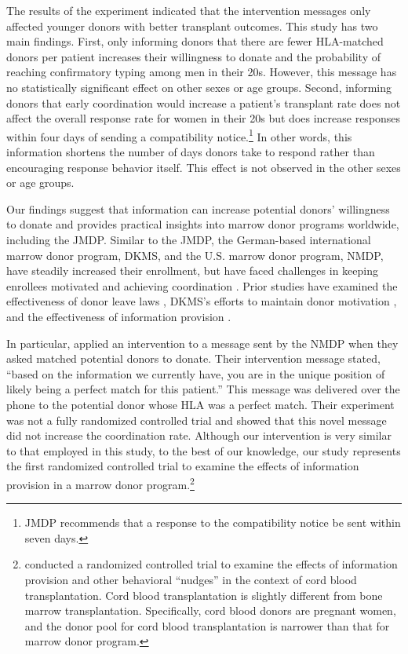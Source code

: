 \documentclass[12pt, a4paper]{article}
\begin{document}
The results of the experiment indicated that the intervention messages only affected younger donors with better transplant outcomes. This study has two main findings. First, only informing donors that there are fewer HLA-matched donors per patient increases their willingness to donate and the probability of reaching confirmatory typing among men in their 20s. However, this message has no statistically significant effect on other sexes or age groups. Second, informing donors that early coordination would increase a patient's transplant rate does not affect the overall response rate for women in their 20s but does increase responses within four days of sending a compatibility notice.\footnote{JMDP recommends that a response to the compatibility notice be sent within seven days.} In other words, this information shortens the number of days donors take to respond rather than encouraging response behavior itself. This effect is not observed in the other sexes or age groups.

Our findings suggest that information can increase potential donors' willingness to donate and provides practical insights into marrow donor programs worldwide, including the JMDP. Similar to the JMDP, the German-based international marrow donor program, DKMS, and the U.S. marrow donor program, NMDP, have steadily increased their enrollment, but have faced challenges in keeping enrollees motivated and achieving coordination \citep{Switzer1999, Switzer2004, Haylock2022}. Prior studies have examined the effectiveness of donor leave laws \citep{Lacetera2014}, DKMS's efforts to maintain donor motivation \citep{Haylock2022}, and the effectiveness of information provision \citep{Switzer2018}.

In particular, \citet{Switzer2018} applied an intervention to a message sent by the NMDP when they asked matched potential donors to donate. Their intervention message stated, ``based on the information we currently have, you are in the unique position of likely being a perfect match for this patient.'' This message was delivered over the phone to the potential donor whose HLA was a perfect match. Their experiment was not a fully randomized controlled trial and showed that this novel message did not increase the coordination rate. Although our intervention is very similar to that employed in this study, to the best of our knowledge, our study represents the first randomized controlled trial to examine the effects of information provision in a marrow donor program.\footnote{\citet{Grieco2018} conducted a randomized controlled trial to examine the effects of information provision and other behavioral ``nudges'' in the context of cord blood transplantation. Cord blood transplantation is slightly different from bone marrow transplantation. Specifically, cord blood donors are pregnant women, and the donor pool for cord blood transplantation is narrower than that for marrow donor program.}
\end{document}
